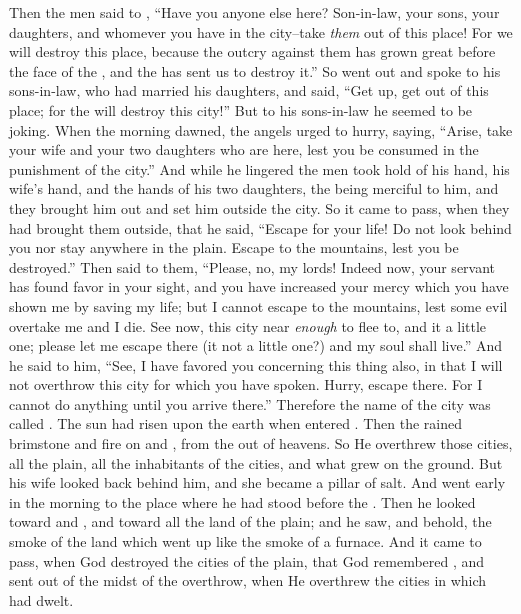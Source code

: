 
\bverse Then the men said to , ``Have you anyone else here? Son-in-law, your sons, your daughters, and whomever you have in the city--take \textit{them} out of this place!
\bverse For we will destroy this place, because the outcry against them has grown great before the face of the \lord, and the \lord has sent us to destroy it.''
\bverse So  went out and spoke to his sons-in-law, who had married his daughters, and said, ``Get up, get out of this place; for the \lord will destroy this city!'' But to his sons-in-law he seemed to be joking.
\bverse When the morning dawned, the angels urged  to hurry, saying, ``Arise, take your wife and your two daughters who are here, lest you be consumed in the punishment of the city.''
\bverse And while he lingered the men took hold of his hand, his wife's hand, and the hands of his two daughters, the \lord being merciful to him, and they brought him out and set him outside the city.
\bverse So it came to pass, when they had brought them outside, that he said, ``Escape for your life! Do not look behind you nor stay anywhere in the plain. Escape to the mountains, lest you be destroyed.''
\bverse Then  said to them, ``Please, no, my lords!
\bverse Indeed now, your servant has found favor in your sight, and you have increased your mercy which you have shown me by saving my life; but I cannot escape to the mountains, lest some evil overtake me and I die.
\bverse See now, this city \is near \textit{enough} to flee to, and it \is a little one; please let me escape there (\is it not a little one?) and my soul shall live.''
\bverse And he said to him, ``See, I have favored you concerning this thing also, in that I will not overthrow this city for which you have spoken.
\bverse Hurry, escape there. For I cannot do anything until you arrive there.'' Therefore the name of the city was called .
\bverse The sun had risen upon the earth when  entered . 
\bverse Then the \lord rained brimstone and fire on  and , from the \lord out of heavens.
\bverse So He overthrew those cities, all the plain, all the inhabitants of the cities, and what grew on the ground.
\bverse But his wife looked back behind him, and she became a pillar of salt.
\bverse And  went early in the morning to the place where he had stood before the \lord.
\bverse Then he looked toward  and , and toward all the land of the plain; and he saw, and behold, the smoke of the land which went up like the smoke of a furnace.
\bverse And it came to pass, when God destroyed the cities of the plain, that God remembered , and sent  out of the midst of the overthrow, when He overthrew the cities in which  had dwelt.

